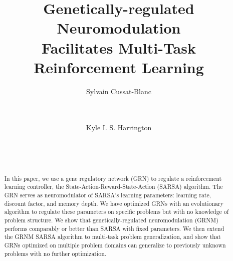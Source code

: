 \documentclass{sig-alternate-2}
\title{Genetically-regulated Neuromodulation\\
    Facilitates Multi-Task Reinforcement Learning}
\author{
\alignauthor
Sylvain Cussat-Blanc\\
\affaddr{University of Toulouse}\\
\affaddr{21 All\'ee de Brienne} \\
\affaddr{31042 Toulouse, France}
\email{cussat@irit.fr}
\and
\alignauthor
Kyle I. S. Harrington\\
\affaddr{Beth Israel Deaconess Medical Center}\\
\affaddr{Harvard Medical School}\\
\affaddr{02215 Boston, MA} \\
\email{kharrin3@bidmc.harvard.edu}
}
\date{}
\begin{document}
\maketitle

\begin{abstract}
In this paper, we use a gene regulatory network (GRN) to regulate a reinforcement learning controller, the State-Action-Reward-State-Action (SARSA) algorithm. The GRN serves as neuromodulator of SARSA's learning parameters: learning rate, discount factor, and memory depth. We have optimized GRNs with an evolutionary algorithm to regulate these parameters on specific problems but with no knowledge of problem structure. We show that genetically-regulated neuromodulation (GRNM) performs comparably or better than SARSA with fixed parameters. We then extend the GRNM SARSA algorithm to multi-task problem generalization, and show that GRNs optimized on multiple problem domains can generalize to previously unknown problems with no further optimization. 
\end{abstract}

















\end{document}
